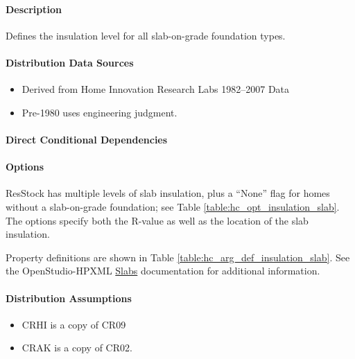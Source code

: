 \paragraph{Description}
% 
Defines the insulation level for all slab-on-grade foundation types.

\paragraph{Distribution Data Sources}
% 
\begin{itemize}
\item
  Derived from Home Innovation Research Labs 1982--2007 Data
\item
  Pre-1980 uses engineering judgment.
\end{itemize}

\paragraph{Direct Conditional Dependencies}


\paragraph{Options}
ResStock has multiple levels of slab insulation, plus a ``None'' flag for homes without a slab-on-grade foundation; see Table \ref{table:hc_opt_insulation_slab}. The options specify both the R-value as well as the location of the slab insulation.



Property definitions are shown in Table \ref{table:hc_arg_def_insulation_slab}. See the OpenStudio-HPXML \href{https://openstudio-hpxml.readthedocs.io/en/v1.10.0/workflow_inputs.html#hpxml-slabs}{Slabs} documentation for additional information.



\paragraph{Distribution Assumptions}
% 
\begin{itemize}

\item
  CRHI is a copy of CR09
\item
  CRAK is a copy of CR02.
\end{itemize}

